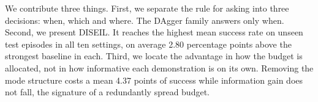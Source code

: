 We contribute three things. First, we separate the rule for asking into three
decisions: when, which and where. The DAgger family answers only when. Second, we
present DISEIL. It reaches the highest mean success rate on unseen test episodes
in all ten settings, on average 2.80 percentage points above the strongest
baseline in each.
Third, we locate the advantage in how the budget is allocated, not in how
informative each demonstration is on its own. Removing the mode structure costs a
mean 4.37 points of success while information gain does not fall, the signature of
a redundantly spread budget.

